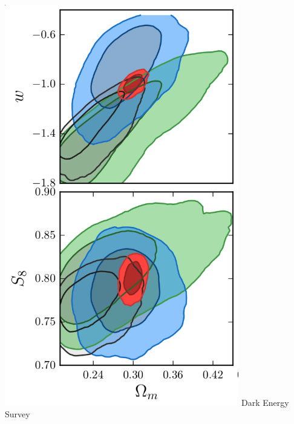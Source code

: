 \documentclass{beamer}
\begin{document}
{\begin{columns}
\begin{column}{0.5\textwidth}
        \end{column}
        \begin{column}{0.5\textwidth}
            \begin{center}
                \includegraphics[width=0.8\textwidth]{des-cosmo-w.png}
                \newline
                {\tiny Dark Energy Survey}
            \end{center}
        \end{column}

    \end{columns}


}
\end{document}

